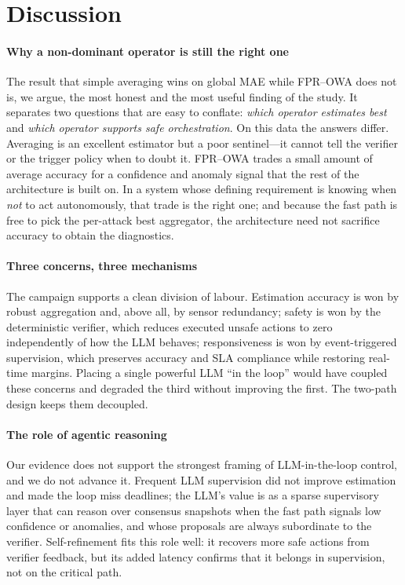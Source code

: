 \documentclass[preprint,11pt]{elsarticle}
\begin{document}


\section{Discussion}
\label{sec:discussion}

\paragraph{Why a non-dominant operator is still the right one}
The result that simple averaging wins on global MAE while FPR--OWA does
not is, we argue, the most honest and the most useful finding of the
study. It separates two questions that are easy to conflate: \emph{which
operator estimates best} and \emph{which operator supports safe
orchestration}. On this data the answers differ. Averaging is an
excellent estimator but a poor sentinel---it cannot tell the verifier or
the trigger policy when to doubt it. FPR--OWA trades a small amount of
average accuracy for a confidence and anomaly signal that the rest of the
architecture is built on. In a system whose defining requirement is
knowing when \emph{not} to act autonomously, that trade is the right one;
and because the fast path is free to pick the per-attack best aggregator,
the architecture need not sacrifice accuracy to obtain the diagnostics.

\paragraph{Three concerns, three mechanisms}
The campaign supports a clean division of labour. Estimation accuracy is
won by robust aggregation and, above all, by sensor redundancy; safety is
won by the deterministic verifier, which reduces executed unsafe actions
to zero independently of how the LLM behaves; responsiveness is won by
event-triggered supervision, which preserves accuracy and SLA compliance
while restoring real-time margins. Placing a single powerful LLM
``in the loop'' would have coupled these concerns and degraded the third
without improving the first. The two-path design keeps them decoupled.

\paragraph{The role of agentic reasoning}
Our evidence does not support the strongest framing of LLM-in-the-loop
control, and we do not advance it. Frequent LLM supervision did not
improve estimation and made the loop miss deadlines; the LLM's value is
as a sparse supervisory layer that can reason over consensus snapshots
when the fast path signals low confidence or anomalies, and whose
proposals are always subordinate to the verifier. Self-refinement fits
this role well: it recovers more safe actions from verifier feedback, but
its added latency confirms that it belongs in supervision, not on the
critical path.
\end{document}
